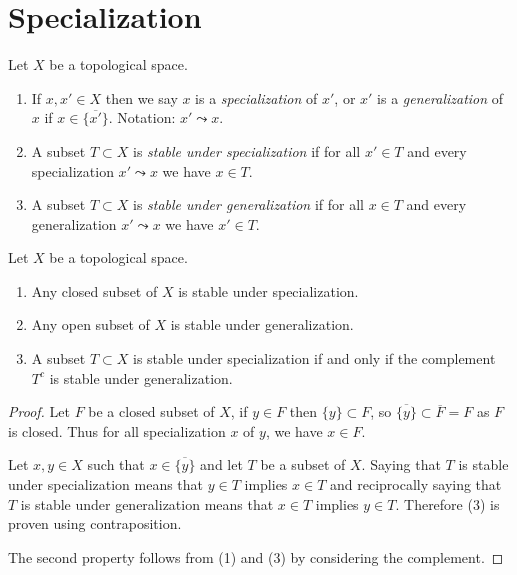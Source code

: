 \section{Specialization}
\label{section-specialization}

\begin{definition}
\label{definition-specialization}
Let $X$ be a topological space.
\begin{enumerate}
\item If $x, x' \in X$ then we say $x$ is a {\it specialization} of $x'$,
or $x'$ is a {\it generalization} of $x$ if $x \in \overline{\{x'\}}$.
Notation: $x' \leadsto x$.
\item A subset $T \subset X$ is {\it stable under specialization}
if for all $x' \in T$ and every specialization $x' \leadsto x$ we have
$x \in T$.
\item A subset $T \subset X$ is {\it stable under generalization}
if for all $x \in T$ and every generalization $x' \leadsto x$ we have
$x' \in T$.
\end{enumerate}
\end{definition}

\begin{lemma}
\label{lemma-open-closed-specialization}
Let $X$ be a topological space.
\begin{enumerate}
\item Any closed subset of $X$ is stable under specialization.
\item Any open subset of $X$ is stable under generalization.
\item A subset $T \subset X$ is stable under specialization
if and only if
the complement $T^c$ is stable under generalization.
\end{enumerate}
\end{lemma}

\begin{proof}
Let $F$ be a closed subset of $X$, if $y\in F$ then $\{y\} \subset F$, so
$\overline{\{y\}} \subset \overline{F} = F$ as $F$ is closed. Thus for all
specialization $x$ of $y$, we have $x\in F$.

\medskip\noindent
Let $x, y\in X$ such that $x\in \overline{\{y\}}$ and let $T$ be a subset of
$X$. Saying that $T$ is stable under specialization means that $y\in T$ implies
$x\in T$ and reciprocally saying that $T$ is stable under generalization means
that $x\in T$ implies $y\in T$. Therefore (3) is proven using contraposition.

\medskip\noindent
The second property follows from (1) and (3) by considering the complement.
\end{proof}

